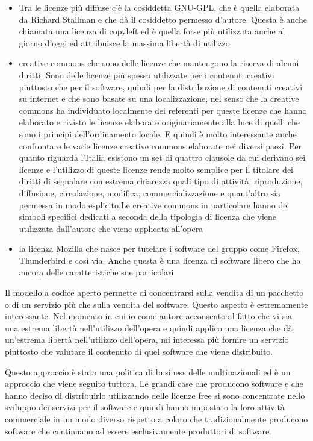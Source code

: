 \begin{itemize}
    \item Tra le licenze più diffuse c'è la cosiddetta GNU-GPL, che è quella elaborata da Richard Stallman e che dà il cosiddetto permesso d'autore. Questa è anche chiamata una licenza di copyleft ed è quella forse più utilizzata anche al giorno d'oggi ed attribuisce la massima libertà di utilizzo
    \item creative commons che sono delle licenze che mantengono la riserva di alcuni diritti. Sono delle licenze più spesso utilizzate per i contenuti creativi piuttosto che per il software, quindi per la distribuzione di contenuti creativi su internet e che sono basate su una localizzazione, nel senso che la creative commons ha individuato localmente dei referenti per queste licenze che hanno elaborato e rivisto le licenze elaborate originariamente alla luce di quelli che sono i principi dell'ordinamento locale. E quindi è molto interessante anche confrontare le varie licenze creative commons elaborate nei diversi paesi. Per quanto riguarda l'Italia esistono un set di quattro clausole da cui derivano sei licenze e l'utilizzo di queste licenze rende molto semplice per il titolare dei diritti di segnalare con estrema chiarezza quali tipo di attività, riproduzione, diffusione, circolazione, modifica, commercializzazione e quant'altro sia permessa in modo esplicito.Le creative commons in particolare hanno dei simboli specifici dedicati a seconda della tipologia di licenza che viene utilizzata dall'autore che viene applicata all'opera
    \item la licenza Mozilla che nasce per tutelare i software del gruppo come Firefox, Thunderbird e così via. Anche questa è una licenza di software libero che ha ancora delle caratteristiche sue particolari
\end{itemize}


Il modello a codice aperto permette di concentrarsi sulla vendita di un pacchetto o di un servizio più che sulla vendita del software. Questo aspetto è estremamente interessante. Nel momento in cui io come autore acconsento al fatto che vi sia una estrema libertà nell'utilizzo dell'opera e quindi applico una licenza che dà un'estrema libertà nell'utilizzo dell'opera, mi interessa più fornire un servizio piuttosto che valutare il contenuto di quel software che viene distribuito. 

Questo approccio è stata una politica di business delle multinazionali ed è un approccio che viene seguito tuttora. Le grandi case che producono software e che hanno deciso di distribuirlo utilizzando delle licenze free si sono concentrate nello sviluppo dei servizi per il software e quindi hanno impostato la loro attività commerciale in un modo diverso rispetto a coloro che tradizionalmente producono software che continuano ad essere esclusivamente produttori di software. 

